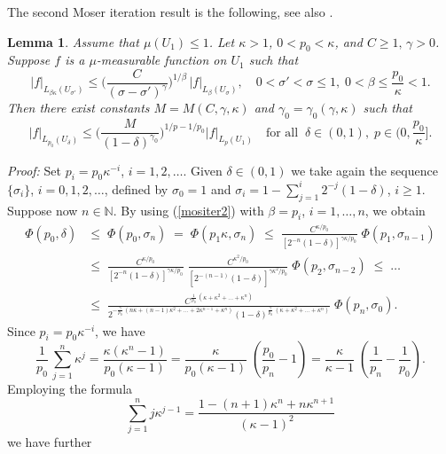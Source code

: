 \documentclass[10pt]{article}
\newtheorem{lemma}{Lemma}[section]
\newcommand{\iN}{\mathbb{N}}
\begin{document}
$\mbox{}$

\noindent The second Moser iteration result is the following, see
also \cite[Lemma 2.5]{CZ}.
\begin{lemma} \label{moserit2}
Assume that $\mu(U_1)\le 1$. Let $\kappa>1$, $0<p_0<\kappa$, and
$C\ge 1,\,\gamma>0$. Suppose $f$ is a $\mu$-measurable function on
$U_1$ such that
\begin{equation} \label{mositer2}
|f|_{L_{\beta\kappa}(U_{\sigma'})}\le
\Big(\frac{C}{(\sigma-\sigma')^{\gamma}}\Big)^{1/\beta}\,|f|_{L_{\beta}(U_{\sigma})},
\quad 0<\sigma'<\sigma\le 1,\;0<\beta\le \frac{p_0}{\kappa}<1.
\end{equation}
Then there exist constants $M=M(C,\gamma,\kappa)$ and
$\gamma_0=\gamma_0(\gamma,\kappa)$ such that
\[ |f|_{L_{p_0}(U_{\delta})}\le
\Big(\frac{M}{(1-\delta)^{\gamma_0}}\Big)^{1/p-1/p_0}
|f|_{L_{p}(U_1)}\quad \mbox{for all}\;\;\delta\in(0,1),\;p\in
(0,\frac{p_0}{\kappa}] .\]
\end{lemma}
{\em Proof:} Set $p_i=p_0 \kappa^{-i}$, $i=1,2,\ldots$. Given
$\delta\in(0,1)$ we take again the sequence $\{\sigma_i\}$,
$i=0,1,2,\ldots$, defined by $\sigma_0=1$ and
$\sigma_i=1-\sum_{j=1}^i 2^{-j} (1-\delta)$, $i\ge 1$. Suppose now
$n\in \iN$. By using (\ref{mositer2}) with $\beta=p_i$,
$i=1,\ldots,n$, we obtain
\begin{align*}
\Phi(p_0,\delta) & \le \; \Phi(p_0,\sigma_n)\;=\;\Phi(p_1
\kappa,\sigma_n)\;\le
\;\frac{C^{\kappa/p_0}}{[2^{-n}(1-\delta)]^{\gamma
 \kappa/p_0}}\;\Phi(p_1,\sigma_{n-1})\\
& \le \; \frac{C^{\kappa/p_0}}{[2^{-n}(1-\delta)]^{\gamma
 \kappa/p_0}}\; \frac{C^{\kappa^2/p_0}}{[2^{-(n-1)}(1-\delta)]^{\gamma
 \kappa^2/p_0}}\;\Phi(p_2,\sigma_{n-2})\;\le\;\dots\\
& \le \; \frac{C^{\frac{1}{p_0}\,(\kappa+\kappa^2+\ldots+\kappa^n)}}
{2^{-\frac{\gamma}{p_0}\,(n\kappa+(n-1)\kappa^2+\ldots+2\kappa^{n-1}+\kappa^n)}
(1-\delta)^{\frac{\gamma}{p_0}\,(\kappa+\kappa^2+\ldots+\kappa^n)}}\;\Phi(p_n,\sigma_0).
\end{align*}
Since $p_i=p_0 \kappa^{-i}$, we have
\[ \frac{1}{p_0}\,\sum_{j=1}^n \kappa^j = \frac{\kappa(\kappa^n-1)}{p_0(\kappa-1)}
= \frac{\kappa}{p_0(\kappa-1)}\;(\frac{p_0}{p_n}-1)=
\frac{\kappa}{\kappa-1}\;(\frac{1}{p_n}-\frac{1}{p_0}).\] Employing
the formula
\[ \sum_{j=1}^n j
\kappa^{j-1}=\frac{1-(n+1)\kappa^n+n\kappa^{n+1}}{(\kappa-1)^2}\] we
have further
\end{document}
